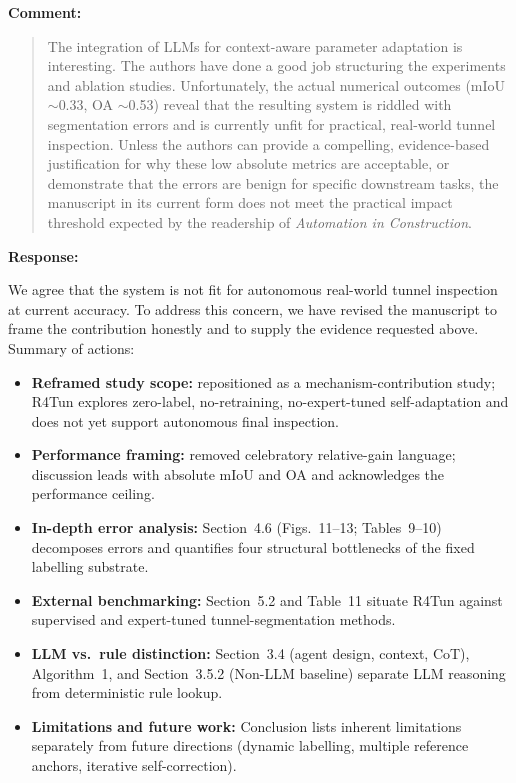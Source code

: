 \documentclass[11pt,a4paper]{article}
\newenvironment{commentblock}{%
  \par\smallskip\noindent\textbf{Comment:}\par
  \begin{quote}\itshape\color{black}
}{%
  \end{quote}\smallskip
}
\newenvironment{responseblock}{%
  \par\smallskip\noindent\textbf{Response:}\par
  \begingroup\color{responsegreen}
}{%
  \endgroup\smallskip
}
\begin{document}
\begin{commentblock}
The integration of LLMs for context-aware parameter adaptation is interesting. The authors have done a good job structuring the experiments and ablation studies. Unfortunately, the actual numerical outcomes (mIoU $\sim$0.33, OA $\sim$0.53) reveal that the resulting system is riddled with segmentation errors and is currently unfit for practical, real-world tunnel inspection. Unless the authors can provide a compelling, evidence-based justification for why these low absolute metrics are acceptable, or demonstrate that the errors are benign for specific downstream tasks, the manuscript in its current form does not meet the practical impact threshold expected by the readership of \emph{Automation in Construction}.
\end{commentblock}
\begin{responseblock}
We agree that the system is not fit for autonomous real-world tunnel inspection at current accuracy. To address this concern, we have revised the manuscript to frame the contribution honestly and to supply the evidence requested above. Summary of actions:
\begin{itemize}[nosep]
  \item \textbf{Reframed study scope:} repositioned as a mechanism-contribution study; R4Tun explores zero-label, no-retraining, no-expert-tuned self-adaptation and does not yet support autonomous final inspection.
  \item \textbf{Performance framing:} removed celebratory relative-gain language; discussion leads with absolute mIoU and OA and acknowledges the performance ceiling.
  \item \textbf{In-depth error analysis:} Section~4.6 (Figs.~11--13; Tables~9--10) decomposes errors and quantifies four structural bottlenecks of the fixed labelling substrate.
  \item \textbf{External benchmarking:} Section~5.2 and Table~11 situate R4Tun against supervised and expert-tuned tunnel-segmentation methods.
  \item \textbf{LLM vs.\ rule distinction:} Section~3.4 (agent design, context, CoT), Algorithm~1, and Section~3.5.2 (Non-LLM baseline) separate LLM reasoning from deterministic rule lookup.
  \item \textbf{Limitations and future work:} Conclusion lists inherent limitations separately from future directions (dynamic labelling, multiple reference anchors, iterative self-correction).
\end{itemize}
\end{responseblock}
\end{document}
